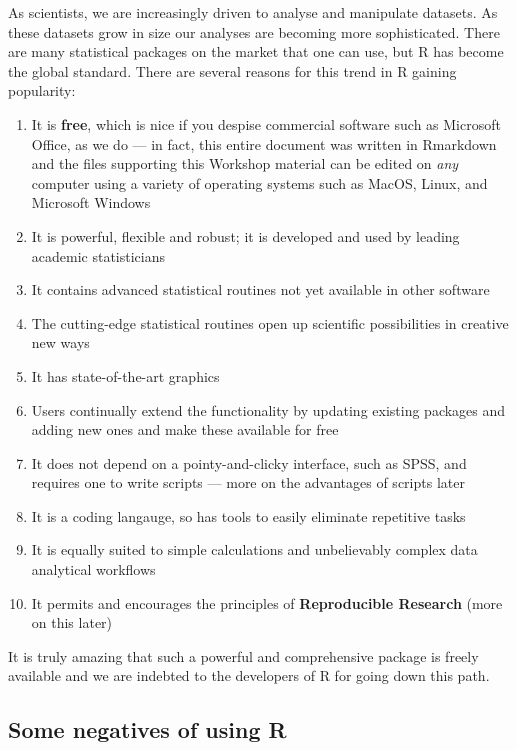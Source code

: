 \documentclass[
]{book}
\begin{document}
As scientists, we are increasingly driven to analyse and manipulate datasets. As these datasets grow in size our analyses are becoming more sophisticated. There are many statistical packages on the market that one can use, but R has become the global standard. There are several reasons for this trend in R gaining popularity:

\begin{enumerate}
\def\labelenumi{\arabic{enumi}.}
\item
  It is \textbf{free}, which is nice if you despise commercial software such as Microsoft Office, as we do --- in fact, this entire document was written in Rmarkdown and the files supporting this Workshop material can be edited on \emph{any} computer using a variety of operating systems such as MacOS, Linux, and Microsoft Windows
\item
  It is powerful, flexible and robust; it is developed and used by leading academic statisticians
\item
  It contains advanced statistical routines not yet available in other software
\item
  The cutting-edge statistical routines open up scientific possibilities in creative new ways
\item
  It has state-of-the-art graphics
\item
  Users continually extend the functionality by updating existing packages and adding new ones and make these available for free
\item
  It does not depend on a pointy-and-clicky interface, such as SPSS, and requires one to write scripts --- more on the advantages of scripts later
\item
  It is a coding langauge, so has tools to easily eliminate repetitive tasks
\item
  It is equally suited to simple calculations and unbelievably complex data analytical workflows
\item
  It permits and encourages the principles of \textbf{Reproducible Research} (more on this later)
\end{enumerate}

It is truly amazing that such a powerful and comprehensive package is freely available and we are indebted to the developers of R for going down this path.

\hypertarget{some-negatives-of-using-r}{%
\subsection{Some negatives of using R}\label{some-negatives-of-using-r}}
\end{document}
